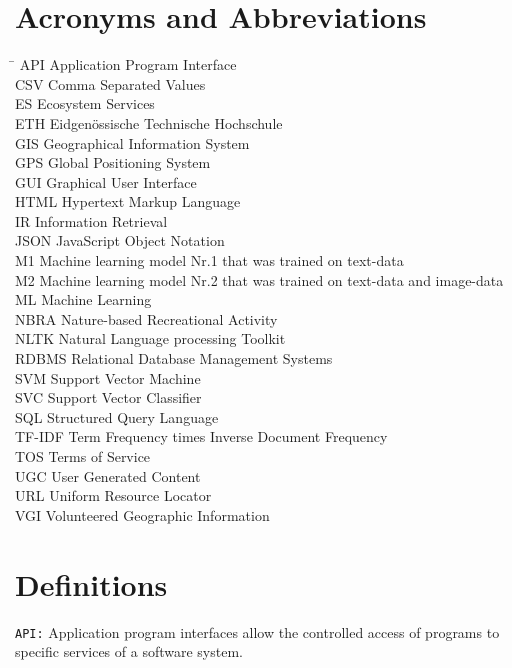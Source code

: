 \section*{Acronyms and Abbreviations}
\begin{tabbing}
 \hspace*{1.6cm}  \= \kill
 API \> Application Program Interface \\
 CSV \> Comma Separated Values \\
 ES \> Ecosystem Services \\
 ETH \> Eidgen\"{o}ssische Technische Hochschule \\
 GIS \> Geographical Information System \\
 GPS \> Global Positioning System \\
 GUI \> Graphical User Interface \\
 HTML \> Hypertext Markup Language \\
 IR \> Information Retrieval \\
 JSON \> JavaScript Object Notation \\
 M1 \> Machine learning model Nr.1 that was trained on text-data \\
 M2 \> Machine learning model Nr.2 that was trained on text-data and image-data \\
 ML \> Machine Learning \\
 NBRA \> Nature-based Recreational Activity \\
 NLTK \> Natural Language processing Toolkit \\ 
 RDBMS \> Relational Database Management Systems \\
 SVM \> Support Vector Machine \\
 SVC \> Support Vector Classifier \\
 SQL \> Structured Query Language \\
 TF-IDF \> Term Frequency times Inverse Document Frequency \\
 TOS \> Terms of Service \\
 UGC \> User Generated Content \\
 URL \> Uniform Resource Locator \\ 
 VGI \> Volunteered Geographic Information
\end{tabbing}

\section*{Definitions} \label{definitions}
\texttt{API:} Application program interfaces allow the controlled access of programs to specific services of a software system. 
\newline

